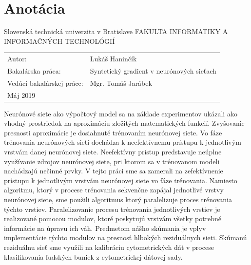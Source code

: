 \documentclass[12pt, twoside]{book}
\newcommand{\itab}[1]{\hspace{0em}\rlap{#1}}
\newcommand{\tab}[1]{\hspace{.31\textwidth}\rlap{#1}}
\begin{document}
\section*{Anotácia}
Slovenská technická univerzita v Bratislave
\newline
FAKULTA INFORMATIKY A INFORMAČNÝCH TECHNOLÓGIÍ
\newline
\itab{Študijný program:}    \tab{Informatika}
\begin{table}[h!]
\renewcommand{\arraystretch}{1.4}
\begin{tabular}{@{}ll}
Autor: & Lukáš Haninčík \\
Bakalárska práca: & Syntetický gradient v neurónových sieťach \\
Vedúci bakalárskej práce: & Mgr. Tomáš Jarábek \\
Máj 2019
\end{tabular}
\end{table}
\newline
\newline
Neurónové siete ako výpočtový model sa na základe experimentov ukázali ako vhodný prostriedok na aproximáciu zložitých matematických funkcií. Zvyšovanie presnosti aproximácie je dosiahnuté trénovaním neurónovej siete. Vo fáze trénovania neurónových sieti dochádza k neefektívnemu prístupu k jednotlivým vrstvám danej neurónovej siete. Neefektívny prístup predstavuje neúplne využívanie zdrojov neurónovej siete, pri ktorom sa v trénovanom modeli nachádzajú nečinné prvky. V tejto práci sme sa zamerali na zefektívnenie prístupu k jednotlivým vrstvám neurónovej siete vo fáze trénovania. Namiesto algoritmu, ktorý v procese trénovania sekvenčne zapájal jednotlivé vrstvy neurónovej siete, sme použili algoritmus ktorý paralelizuje proces trénovania týchto vrstiev. Paralelizovanie procesu trénovania jednotlivých vrstiev je realizované pomocou modulov, ktoré poskytujú vrstvám všetky potrebné informácie na úpravu ich váh. Predmetom nášho skúmania je vplyv implementácie týchto modulov na presnosť hlbokých reziduálnych sieti. Skúmanú reziduálnu sieť sme využili na kalibráciu cytometrických dát v procese klasifikovania ľudských buniek z cytometrickej dátovej sady. 



\newpage 
\afterpage{\null\thispagestyle{empty}\newpage}
\end{document}
